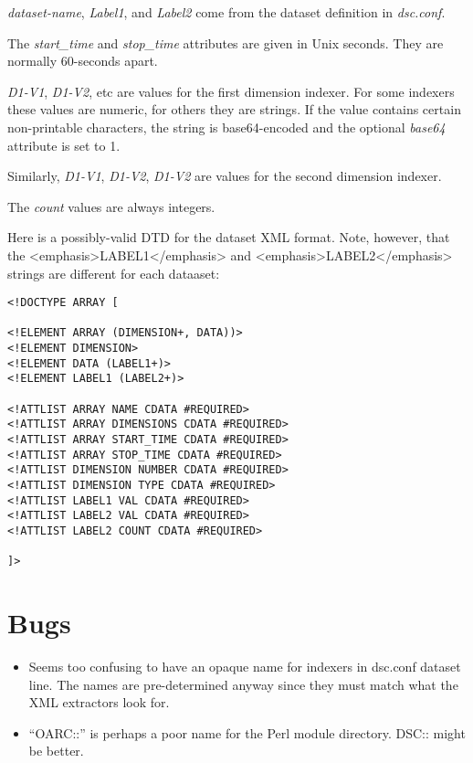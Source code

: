 \documentclass{report}
\begin{document}
\noindent
{\em dataset-name\/},
{\em Label1\/}, and
{\em Label2\/} come from the dataset definition in {\em dsc.conf\/}.

\noindent
The {\em start\_time\/} and {\em stop\_time\/} attributes
are given in Unix seconds.  They are normally 60-seconds apart.

\noindent
{\em D1-V1\/}, {\em D1-V2\/}, etc are values for the
first dimension indexer.  For some indexers these values are
numeric, for others they are strings.  If the value contains
certain non-printable characters, the string is base64-encoded
and the optional {\em base64\/} attribute is set to 1.

\noindent
Similarly, {\em D1-V1\/}, {\em D1-V2\/}, {\em D1-V2\/} are
values for the second dimension indexer.

\noindent
The {\em count\/} values are always integers.

\noindent
Here is a possibly-valid DTD for the dataset XML format.
Note, however, that the <emphasis>LABEL1</emphasis>
and <emphasis>LABEL2</emphasis> strings are different
for each dataaset:

\begin{verbatim}
<!DOCTYPE ARRAY [  

<!ELEMENT ARRAY (DIMENSION+, DATA))>
<!ELEMENT DIMENSION>
<!ELEMENT DATA (LABEL1+)>
<!ELEMENT LABEL1 (LABEL2+)>

<!ATTLIST ARRAY NAME CDATA #REQUIRED>
<!ATTLIST ARRAY DIMENSIONS CDATA #REQUIRED>
<!ATTLIST ARRAY START_TIME CDATA #REQUIRED>
<!ATTLIST ARRAY STOP_TIME CDATA #REQUIRED>
<!ATTLIST DIMENSION NUMBER CDATA #REQUIRED>
<!ATTLIST DIMENSION TYPE CDATA #REQUIRED>
<!ATTLIST LABEL1 VAL CDATA #REQUIRED>
<!ATTLIST LABEL2 VAL CDATA #REQUIRED>
<!ATTLIST LABEL2 COUNT CDATA #REQUIRED>

]> 
\end{verbatim}

\chapter{Bugs}

\begin{itemize}

\item
	Seems too confusing to have an opaque name for indexers in
	dsc.conf dataset line.  The names are pre-determined anyway
	since they must match what the XML extractors look for.

\item
	``OARC::'' is perhaps a poor name for the Perl module
	directory.  DSC:: might be better.

\end{itemize}
\end{document}
